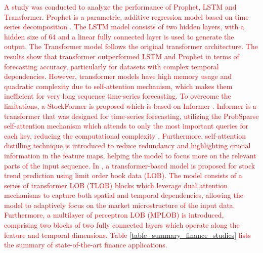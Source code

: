 \documentclass[preprint,12pt]{elsarticle}
\begin{document}
\textcolor{red}{A study was conducted to analyze the performance of Prophet, LSTM and Transformer. Prophet is a parametric, additive regression model based on time series decomposition \citep{mozaffari_predictive_2024}. The LSTM model consists of two hidden layers, with a hidden size of 64 and a linear fully connected layer is used to generate the output. The Transformer model follows the original transformer architecture. The results show that transformer outperformed LSTM and Prophet in terms of forecasting accuracy, particularly for datasets with complex temporal dependencies. However, transformer models have high memory usage and quadratic complexity due to self-attention mechanism, which makes them inefficient for very long sequence time-series forecasting. To overcome the limitations, a StockFormer is proposed which is based on Informer \citep{li_transformer_2025}. Informer is a transformer that was designed for time-series forecasting, utilizing the ProbSparse self-attention mechanism which attends to only the most important queries for each key, reducing the computational complexity \citep{zhou_informer_2021}. Furthermore, self-attention distilling technique is introduced to reduce redundancy and highlighting crucial information in the feature maps, helping the model to focus more on the relevant parts of the input sequence. In \citep{berti_tlob_2025}, a transformer-based model is proposed for stock trend prediction using limit order book data (LOB). The model consists of a series of transformer LOB (TLOB) blocks which leverage dual attention mechanisms to capture both spatial and temporal dependencies, allowing the model to adaptively focus on the market microstructure of the input data. Furthermore, a multilayer of perceptron LOB (MPLOB) is introduced, comprising two blocks of two fully connected layers which operate along the feature and temporal dimensions. Table \ref{table_summary_finance_studies} lists the summary of state-of-the-art finance applications.}
\end{document}
